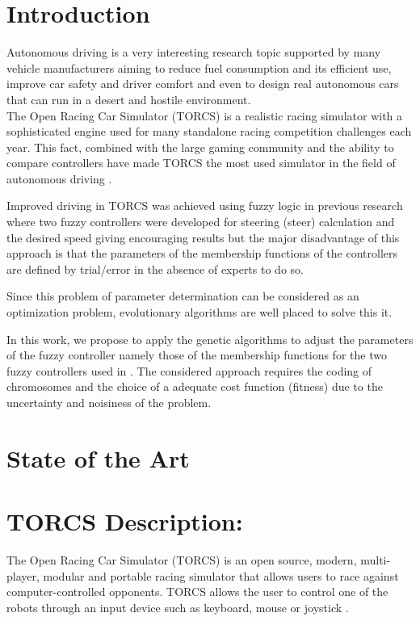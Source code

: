 \documentclass[runningheads,a4paper]{llncs}
\begin{document}
	\section{Introduction}
	\label{sec:intro}

Autonomous driving is a very interesting research topic supported by many vehicle manufacturers aiming to reduce fuel consumption and its efficient use, improve car safety and driver comfort and even to design real autonomous cars that can run in a desert and hostile environment. \\
The Open Racing Car Simulator (TORCS) is a realistic racing simulator with a sophisticated engine used for many standalone racing competition challenges each year. This fact, combined with the large gaming community and the ability to compare controllers have made TORCS the most used simulator in the field of autonomous driving \cite{17}.

Improved driving in TORCS was achieved using fuzzy logic in previous research where two fuzzy controllers were developed for steering (steer) calculation and the desired speed giving encouraging results but the major disadvantage of this approach is that the parameters of the membership functions of the controllers are defined by trial/error in the absence of experts to do so.

Since this problem of parameter determination can be considered as an optimization problem, evolutionary algorithms are well placed to solve this it.

In this work, we propose to apply the genetic algorithms to adjust the parameters of the fuzzy controller namely those of the membership functions for the two fuzzy controllers used in \cite{25}.
The considered approach  requires the coding of chromosomes and the choice of a adequate cost function (fitness) due to the uncertainty and noisiness of the problem.



	\section{State of the Art}


	\label{sec:soa}

\section{ TORCS Description: }
	\label{sec:torcs}
The Open Racing Car Simulator (TORCS) is an open source, modern, multi-player, modular and portable racing simulator that allows users to race against computer-controlled opponents. TORCS allows the user to control one of the robots through an input device such as keyboard, mouse or joystick \cite{8}.
\end{document}
